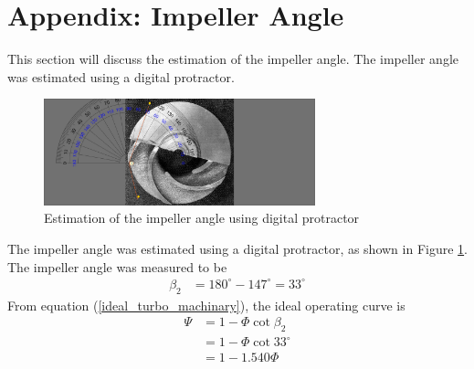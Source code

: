 \section{Appendix: Impeller Angle}
\label{sec:impeller_angle}
This section will discuss the estimation of the impeller angle. The impeller angle was estimated using a digital protractor. 

\begin{figure}[h]
    \centering
    \includegraphics[width=0.7\textwidth]{Sections/Figures/Impeller Angle.jpg}
    \caption{Estimation of the impeller angle using digital protractor}
    \label{fig:impeller_angle}
\end{figure}
The impeller angle was estimated using a digital protractor, as shown in Figure \ref{fig:impeller_angle}. The impeller angle was measured to be 
\begin{align*}
    \beta_2 &= 180^\circ - 147^\circ = 33^\circ
\end{align*}
From equation (\ref{ideal_turbo_machinary}), the ideal operating curve is
\begin{align*}
    \Psi &= 1 - \Phi \cot{\beta_2} \\
    &= 1 - \Phi \cot{33^\circ} \\
    &= 1 - 1.540 \Phi
\end{align*}
